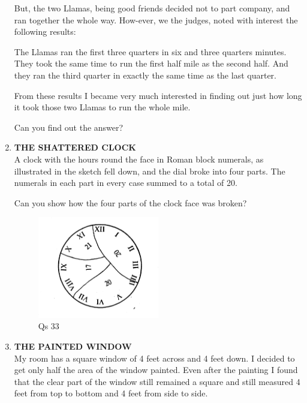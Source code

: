 \documentclass[12pt]{article}
\begin{document}
\begin{enumerate}
But, the two Llamas,  being  good  friends  decided  not to part  company,  and ran together  the whole  way.  How-ever,  we the  judges,  noted  with  interest  the  following results: 

The Llamas  ran  the  first  three  quarters  in six and three  quarters  minutes.  They  took  the  same  time  to run the first half mile  as the second  half.  And  they  ran the third  quarter  in exactly  the  same  time  as the last quarter. 

From  these  results  I became  very  much  interested  in finding  out  just  how  long  it took  those  two  Llamas  to run the whole  mile. 

Can you find  out the answer? 
%
\item \textbf{THE  SHATTERED  CLOCK} \\
A clock  with  the  hours  round  the  face  in Roman block  numerals,  as illustrated  in the sketch fell down,  and  the  dial  broke  into  four  parts.  The numerals  in each  part  in every  case  summed  to a total of 20. 

Can you  show  how  the four  parts  of the  clock  face was broken? 

\begin{figure}[h]
\begin{center}
\includegraphics[width=0.5\textwidth]{images/sdevi_q33.png}
\caption{ Qs 33}
\end{center}
\end{figure}

%
\item \textbf{THE  PAINTED  WINDOW} \\
My room  has  a square  window  of 4 feet  across  and  4 feet down.  I decided  to get  only  half  the area  of the window  painted.  Even  after  the painting  I found  that the clear  part  of the window  still remained  a square  and still measured  4 feet from  top to bottom  and 4 feet  from side to side. 


\end{enumerate}
\end{document}
